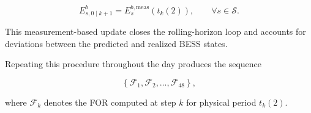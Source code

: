 \documentclass[journal]{IEEEtran}
\begin{document}
\begin{equation} \label{eq:state_update} E^{b}_{s,0\mid k+1} = E^{b,\mathrm{meas}}_{s}\!\left(t_k(2)\right), \qquad \forall s\in\mathcal{S}. 
\end{equation} 

This measurement-based update closes the rolling-horizon loop and accounts for deviations between the predicted and realized BESS states.

Repeating this procedure throughout the day produces the sequence

\begin{equation} \label{eq:for_sequence} \left\{ \mathcal{F}_{1}, \mathcal{F}_{2}, \ldots, \mathcal{F}_{48} \right\}, \end{equation} 

where \(\mathcal{F}_{k}\) denotes the FOR computed at step \(k\) for physical period \(t_k(2)\).
\end{document}
